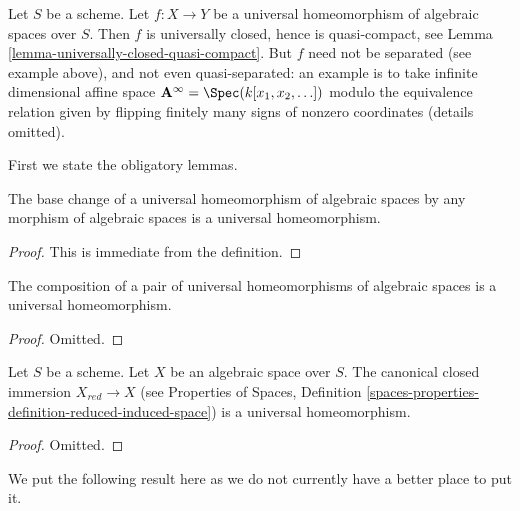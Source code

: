 \noindent
Let $S$ be a scheme.
Let $f : X \to Y$ be a universal homeomorphism of algebraic spaces
over $S$. Then $f$ is universally closed, hence is quasi-compact, see
Lemma \ref{lemma-universally-closed-quasi-compact}.
But $f$ need not be separated (see example above), and not even
quasi-separated: an example is to take infinite dimensional affine
space $\mathbf{A}^\infty = \Spec(k[x_1, x_2, \ldots])$ modulo
the equivalence relation given by flipping finitely many signs of
nonzero coordinates (details omitted).

\medskip\noindent
First we state the obligatory lemmas.

\begin{lemma}
\label{lemma-base-change-universal-homeomorphism}
The base change of a universal homeomorphism of algebraic spaces
by any morphism of algebraic spaces is a universal homeomorphism.
\end{lemma}

\begin{proof}
This is immediate from the definition.
\end{proof}

\begin{lemma}
\label{lemma-composition-universal-homeomorphism}
The composition of a pair of universal homeomorphisms of
algebraic spaces is a universal homeomorphism.
\end{lemma}

\begin{proof}
Omitted.
\end{proof}

\begin{lemma}
\label{lemma-reduction-universal-homeomorphism}
Let $S$ be a scheme. Let $X$ be an algebraic space over $S$.
The canonical closed immersion $X_{red} \to X$ (see
Properties of Spaces, Definition
\ref{spaces-properties-definition-reduced-induced-space})
is a universal homeomorphism.
\end{lemma}

\begin{proof}
Omitted.
\end{proof}

\noindent
We put the following result here as we do not currently have a better
place to put it.

